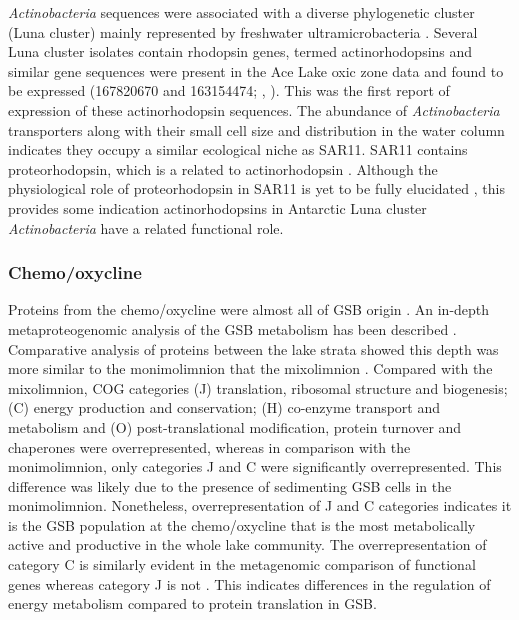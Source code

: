 \emph{Actinobacteria} sequences were associated with a diverse phylogenetic cluster (Luna cluster) mainly represented by freshwater ultramicrobacteria \cite{Hahn2003}. 
Several Luna cluster isolates contain rhodopsin genes, termed actinorhodopsins \cite{Sharma2009} and similar gene sequences were present in the Ace Lake oxic zone data and found to be expressed (167820670 and 163154474; , ).
This was the first report of expression of these actinorhodopsin sequences.
The abundance of \emph{Actinobacteria} transporters along with their small cell size and distribution in the water column indicates they occupy a similar ecological niche as SAR11.
SAR11 contains proteorhodopsin, which is a related to actinorhodopsin \cite{Sharma2009}.
Although the physiological role of proteorhodopsin in SAR11 is yet to be fully elucidated \cite{Fuhrman2008}, this provides some indication actinorhodopsins in Antarctic Luna cluster \emph{Actinobacteria} have a related functional role.

\subsubsection{Chemo/oxycline}
Proteins from the chemo/oxycline were almost all of \ac{GSB} origin . 
An in-depth metaproteogenomic analysis of the \ac{GSB} metabolism has been described \cite{Ng2010a, Ng2010b}.
Comparative analysis of proteins between the lake strata showed this depth was more similar to the monimolimnion that the mixolimnion .
Compared with the mixolimnion, \ac{COG} categories (J) translation, ribosomal structure and biogenesis; (C) energy production and conservation; (H) co-enzyme transport and metabolism and (O) post-translational modification, protein turnover and chaperones were overrepresented, whereas in comparison with the monimolimnion, only categories J and C were significantly overrepresented.
This difference was likely due to the presence of sedimenting \ac{GSB} cells in the monimolimnion.
Nonetheless, overrepresentation of J and C categories indicates it is the \ac{GSB} population at the chemo/oxycline that is the most metabolically active and productive in the whole lake community.
The overrepresentation of category C is similarly evident in the metagenomic comparison of functional genes whereas category J is not \cite{Lauro2011}.
This indicates differences in the regulation of energy metabolism compared to protein translation in \ac{GSB}.

